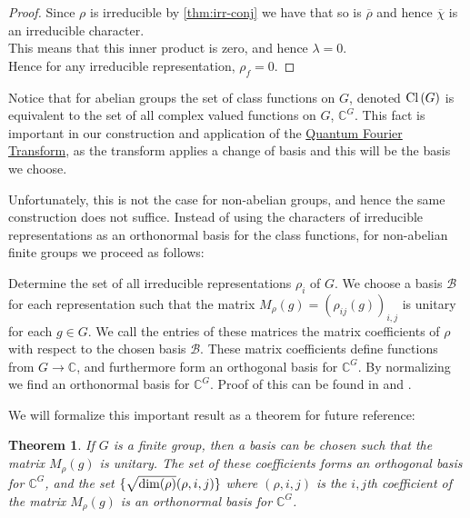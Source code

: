 \documentclass{article}
\theoremstyle{plain}
\newtheorem{theorem}{Theorem}
\theoremstyle{centered}
\newcommand{\conj}[1]{\overline{#1}}
\newcommand{\Cl}[1]{\textnormal{Cl}\left(#1\right)}
\newcommand{\bb}[1]{\mathbb{#1}}
\renewcommand{\cal}[1]{\mathcal{#1}}
\begin{document}
\begin{proof}
            Since $\rho$ is irreducible by \cref{thm:irr-conj} we have that so is $\conj{\rho}$ and hence $\conj{\chi}$ is an irreducible character.\\
            This means that this inner product is zero, and hence $\lambda = 0$.\\
            Hence for any irreducible representation, $\rho_f = 0$.
        \end{proof}
        
        Notice that for abelian groups the set of class functions on $G$, denoted $\Cl{G}$ is equivalent to the set of all complex valued functions on $G$, $\bb{C}^G$. This fact is important in our construction and application of the \hyperref[def:general_QFT]{Quantum Fourier Transform}, as the transform applies a change of basis and this will be the basis we choose.

        Unfortunately, this is not the case for non-abelian groups, and hence the same construction does not suffice. 
        Instead of using the characters of irreducible representations as an orthonormal basis for the class functions, for non-abelian finite groups we proceed as follows:
        \begin{adjustwidth}{3.5em}{}
        Determine the set of all irreducible representations $\rho_i$ of $G$. 
        We choose a basis $\cal{B}$ for each representation such that the matrix $M_\rho(g) = (\rho_{ij}(g))_{i,j}$ is unitary for each $g \in G$. 
        We call the entries of these matrices the matrix coefficients of $\rho$ with respect to the chosen basis $\cal{B}$. 
        These matrix coefficients define functions from $G \to \bb{C}$, and furthermore form an orthogonal basis for $\bb{C}^G$. 
        By normalizing we find an orthonormal basis for $\bb{C}^G$. 
        Proof of this can be found in \cite{perepechaenko} and \cite{serre}.
        \end{adjustwidth}
        We will formalize this important result as a theorem for future reference:
        \begin{theorem}\label{thm:matrix_coefficients}
                If $G$ is a finite group, then a basis can be chosen such that the matrix $M_\rho(g)$ is unitary. The set of these coefficients forms an orthogonal basis for $\bb{C}^G$, and the set $\{\sqrt{\textnormal{dim}(\rho)} (\rho, i, j)\}$ where $(\rho, i, j)$ is the $i,j$th coefficient of the matrix $M_\rho(g)$ is an orthonormal basis for $\bb{C}^G$.
        \end{theorem}
\end{document}
